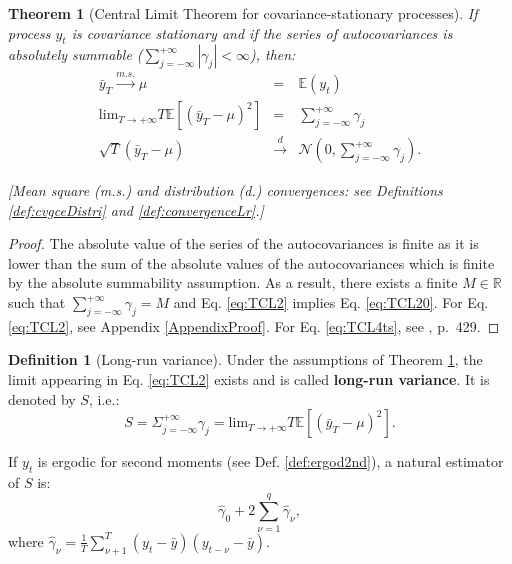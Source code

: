 \documentclass[
  11pt,
]{book}
\newtheorem{theorem}{Theorem}[chapter]
\theoremstyle{definition}
\newtheorem{definition}{Definition}[chapter]
\theoremstyle{definition}
\theoremstyle{definition}
\theoremstyle{definition}
\theoremstyle{remark}
\begin{document}
\begin{theorem}[Central Limit Theorem for covariance-stationary processes]
\protect\hypertarget{thm:CLTcovstat}{}\label{thm:CLTcovstat}If process \(y_t\) is covariance stationary and if the series of autocovariances is absolutely summable (\(\sum_{j=-\infty}^{+\infty} |\gamma_j| <\infty\)), then:
\begin{eqnarray}
\bar{y}_T \overset{m.s.}{\rightarrow} \mu &=& \mathbb{E}(y_t) \label{eq:TCL20}\\
\mbox{lim}_{T \rightarrow +\infty} T \mathbb{E}\left[(\bar{y}_T - \mu)^2\right] &=& \sum_{j=-\infty}^{+\infty} \gamma_j \label{eq:TCL2}\\
\sqrt{T}(\bar{y}_T - \mu) &\overset{d}{\rightarrow}& \mathcal{N}\left(0,\sum_{j=-\infty}^{+\infty} \gamma_j \right) \label{eq:TCL4ts}.
\end{eqnarray}

{[}Mean square (m.s.) and distribution (d.) convergences: see Definitions \ref{def:cvgceDistri} and \ref{def:convergenceLr}.{]}
\end{theorem}

\begin{proof}
The absolute value of the series of the autocovariances is finite as it is lower than the sum of the absolute values of the autocovariances which is finite by the absolute summability assumption. As a result, there exists a finite \(M \in \mathbb{R}\) such that \(\sum_{j=-\infty}^{+\infty} \gamma_j=M\) and Eq. \eqref{eq:TCL2} implies Eq. \eqref{eq:TCL20}. For Eq. \eqref{eq:TCL2}, see Appendix \ref{AppendixProof}. For Eq. \eqref{eq:TCL4ts}, see \citet{Anderson_1971}, p.~429.
\end{proof}

\begin{definition}[Long-run variance]
\protect\hypertarget{def:LRV}{}\label{def:LRV}Under the assumptions of Theorem \ref{thm:CLTcovstat}, the limit appearing in Eq. \eqref{eq:TCL2} exists and is called \textbf{long-run variance}. It is denoted by \(S\), i.e.:
\[
S = \Sigma_{j=-\infty}^{+\infty} \gamma_j  = \mbox{lim}_{T \rightarrow +\infty} T \mathbb{E}[(\bar{y}_T - \mu)^2].
\]
\end{definition}

If \(y_t\) is ergodic for second moments (see Def. \ref{def:ergod2nd}), a natural estimator of \(S\) is:
\begin{equation}
\hat\gamma_0 + 2 \sum_{\nu=1}^{q} \hat\gamma_\nu, \label{eq:covSmplMean}
\end{equation}
where \(\hat\gamma_\nu = \frac{1}{T}\sum_{\nu+1}^{T} (y_t - \bar{y})(y_{t-\nu} - \bar{y})\).
\end{document}
